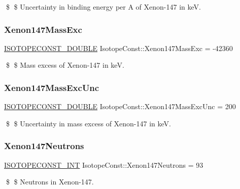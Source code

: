 \$ \$ Uncertainty in binding energy per A of Xenon-\/147 in keV. \mbox{\label{group___isotope_const-_xenon-_xe147_ga539ebada0711fb03d4ae15e50eb2a903}} 
\subsubsection{\texorpdfstring{Xenon147\+Mass\+Exc}{Xenon147MassExc}}
{\footnotesize\ttfamily \mbox{\hyperlink{group___isotope_const-_macros_ga8f45a7272ce02c0b4c65c44636ed719a}{I\+S\+O\+T\+O\+P\+E\+C\+O\+N\+S\+T\+\_\+\+D\+O\+U\+B\+LE}} Isotope\+Const\+::\+Xenon147\+Mass\+Exc = -\/42360}

\$ \$ Mass excess of Xenon-\/147 in keV. \mbox{\label{group___isotope_const-_xenon-_xe147_ga560b3220fae8073f2da464699b1b16b9}} 
\subsubsection{\texorpdfstring{Xenon147\+Mass\+Exc\+Unc}{Xenon147MassExcUnc}}
{\footnotesize\ttfamily \mbox{\hyperlink{group___isotope_const-_macros_ga8f45a7272ce02c0b4c65c44636ed719a}{I\+S\+O\+T\+O\+P\+E\+C\+O\+N\+S\+T\+\_\+\+D\+O\+U\+B\+LE}} Isotope\+Const\+::\+Xenon147\+Mass\+Exc\+Unc = 200}

\$ \$ Uncertainty in mass excess of Xenon-\/147 in keV. \mbox{\label{group___isotope_const-_xenon-_xe147_ga287624af3bd04def65eb9a491a60a459}} 
\subsubsection{\texorpdfstring{Xenon147\+Neutrons}{Xenon147Neutrons}}
{\footnotesize\ttfamily \mbox{\hyperlink{group___isotope_const-_macros_ga5f18360b3e99483a35c32d789e62621c}{I\+S\+O\+T\+O\+P\+E\+C\+O\+N\+S\+T\+\_\+\+I\+NT}} Isotope\+Const\+::\+Xenon147\+Neutrons = 93}

\$ \$ Neutrons in Xenon-\/147. \mbox{\label{group___isotope_const-_xenon-_xe147_ga8760fc45fccfb57b2619b30d8e229024}} 
